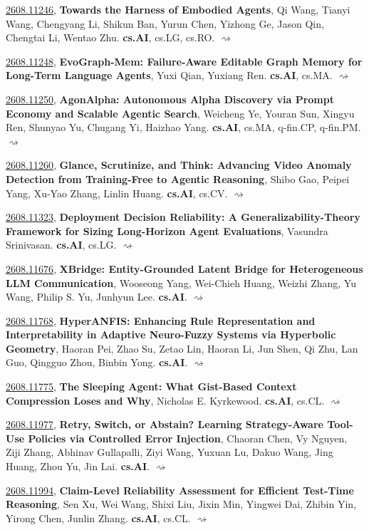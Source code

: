 \documentclass[9pt, a4paper]{article}
\theoremstyle{plain}
\theoremstyle{definition}
\theoremstyle{remark}
\newcommand{\arxiv}[3]{\href{https://arxiv.org/abs/#1}{#1}, \textbf{\textcolor{arxivblue}{#2}}, #3. }
\begin{document}
\arxiv{2608.11246}{Towards the Harness of Embodied Agents}{Qi Wang, Tianyi Wang, Chengyang Li, Shikun Ban, Yurun Chen, Yizhong Ge, Jason Qin, Chengtai Li, Wentao Zhu}\textbf{cs.AI}, cs.LG, cs.RO. \hyperlink{2608.11246}{$\rightsquigarrow$}

\arxiv{2608.11248}{EvoGraph-Mem: Failure-Aware Editable Graph Memory for Long-Term Language Agents}{Yuxi Qian, Yuxiang Ren}\textbf{cs.AI}, cs.MA. \hyperlink{2608.11248}{$\rightsquigarrow$}

\arxiv{2608.11250}{AgonAlpha: Autonomous Alpha Discovery via Prompt Economy and Scalable Agentic Search}{Weicheng Ye, Youran Sun, Xingyu Ren, Shunyao Yu, Chugang Yi, Haizhao Yang}\textbf{cs.AI}, cs.MA, q-fin.CP, q-fin.PM. \hyperlink{2608.11250}{$\rightsquigarrow$}

\arxiv{2608.11260}{Glance, Scrutinize, and Think: Advancing Video Anomaly Detection from Training-Free to Agentic Reasoning}{Shibo Gao, Peipei Yang, Xu-Yao Zhang, Linlin Huang}\textbf{cs.AI}, cs.CV. \hyperlink{2608.11260}{$\rightsquigarrow$}

\arxiv{2608.11323}{Deployment Decision Reliability: A Generalizability-Theory Framework for Sizing Long-Horizon Agent Evaluations}{Vasundra Srinivasan}\textbf{cs.AI}, cs.LG. \hyperlink{2608.11323}{$\rightsquigarrow$}

\arxiv{2608.11676}{XBridge: Entity-Grounded Latent Bridge for Heterogeneous LLM Communication}{Wooseong Yang, Wei-Chieh Huang, Weizhi Zhang, Yu Wang, Philip S. Yu, Junhyun Lee}\textbf{cs.AI}. \hyperlink{2608.11676}{$\rightsquigarrow$}

\arxiv{2608.11768}{HyperANFIS: Enhancing Rule Representation and Interpretability in Adaptive Neuro-Fuzzy Systems via Hyperbolic Geometry}{Haoran Pei, Zhao Su, Zetao Lin, Haoran Li, Jun Shen, Qi Zhu, Lan Guo, Qingguo Zhou, Binbin Yong}\textbf{cs.AI}. \hyperlink{2608.11768}{$\rightsquigarrow$}

\arxiv{2608.11775}{The Sleeping Agent: What Gist-Based Context Compression Loses and Why}{Nicholas E. Kyrkewood}\textbf{cs.AI}, cs.CL. \hyperlink{2608.11775}{$\rightsquigarrow$}

\arxiv{2608.11977}{Retry, Switch, or Abstain? Learning Strategy-Aware Tool-Use Policies via Controlled Error Injection}{Chaoran Chen, Vy Nguyen, Ziji Zhang, Abhinav Gullapalli, Ziyi Wang, Yuxuan Lu, Dakuo Wang, Jing Huang, Zhou Yu, Jin Lai}\textbf{cs.AI}. \hyperlink{2608.11977}{$\rightsquigarrow$}

\arxiv{2608.11994}{Claim-Level Reliability Assessment for Efficient Test-Time Reasoning}{Sen Xu, Wei Wang, Shixi Liu, Jixin Min, Yingwei Dai, Zhibin Yin, Yirong Chen, Junlin Zhang}\textbf{cs.AI}, cs.CL. \hyperlink{2608.11994}{$\rightsquigarrow$}
\end{document}
